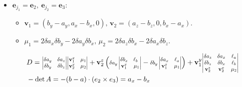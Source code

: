 \documentclass[12pt]{article}
\theoremstyle{definition}
\theoremstyle{remark}
\begin{document}
\begin{itemize}
    \item $\mathbf{e}_{j_1}=\mathbf{e}_2, \ \mathbf{e}_{j_2}=\mathbf{e}_3$: 
        \begin{itemize}
         \item[$\circ$] $\mathbf{v}_1=(b_y-a_y, a_x-b_x, 0),\, \mathbf{v}_2 = (a_z-b_z, 0, b_x-a_x)$.
         \item[$\circ$] $\mu_1= 2 \delta a_x \delta b_y -2 \delta a_y \delta b_x, \, \mu_2= 2 \delta a_z \delta b_x - 2 \delta a_x \delta b_z $.
        \end{itemize}
        \begin{align*}
        &D = \scalebox{0.78}{$\begin{vmatrix}
                    \delta a_y & \delta a_z \\
                    \delta b_y & \delta b_z
            \end{vmatrix}$} 
            \scalebox{0.78}{$\begin{vmatrix}
                    \mathbf{v}_1^x & \mu_1 \\
                    \mathbf{v}_2^x & \mu_2 
            \end{vmatrix}$}
            + \mathbf{v}_2^z \left( 
            \scalebox{0.78}{$ \delta a_y \begin{vmatrix}
                    \delta b_x & \ell_b \\
                    \mathbf{v}_1^x & \mu_1
            \end{vmatrix}$} -
            \scalebox{0.78}{$ \delta b_y \begin{vmatrix}
                    \delta a_x & \ell_a\\
                    \mathbf{v}_1^x & \mu_1
            \end{vmatrix}$}
            \right) +
            \mathbf{v}_1^y \scalebox{0.78}{$ \begin{vmatrix}
                    \delta a_z & \delta a_x & \ell_a\\
                    \delta b_z & \delta b_x & \ell_b\\
                    \mathbf{v}_2^z & \mathbf{v}_2^x & \mu_2
            \end{vmatrix}$} \\
        &-\det A = -(b-a)\cdot(e_2 \times e_3) = a_x - b_x
        \end{align*}



\end{itemize}
\end{document}
